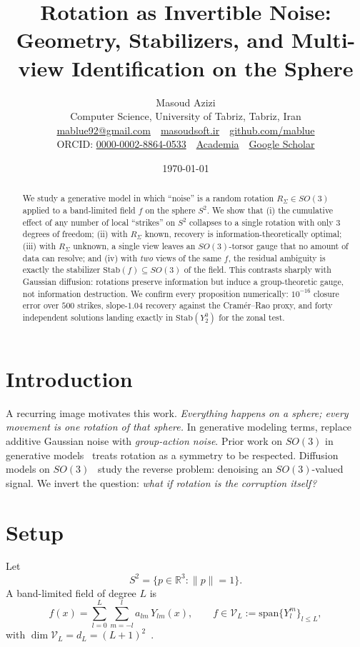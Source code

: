 \documentclass[11pt,a4paper]{article}
\title{\bfseries Rotation as Invertible Noise:\\
Geometry, Stabilizers, and Multi-view Identification on the Sphere}
\author{
  Masoud Azizi\\
  \small Computer Science, University of Tabriz, Tabriz, Iran\\
  \small \href{mailto:mablue92@gmail.com}{mablue92@gmail.com}
  \,\textbar\, \href{https://masoudsoft.ir}{masoudsoft.ir}
  \,\textbar\, \href{https://github.com/mablue}{github.com/mablue}\\
  \small ORCID: \href{https://orcid.org/0000-0002-8864-0533}{0000-0002-8864-0533}
  \,\textbar\, \href{https://independent.academia.edu/azizimasoud}{Academia}
  \,\textbar\, \href{https://scholar.google.com/citations?user=rtZohjUAAAAJ}{Google Scholar}
}
\date{\today}
\theoremstyle{remark}
\begin{document}
\maketitle

\begin{abstract}
We study a generative model in which ``noise'' is a random rotation
$R_\Sigma \in SO(3)$ applied to a band-limited field $f$ on the sphere $S^2$.
We show that (i) the cumulative effect of any number of local ``strikes''
on $S^2$ collapses to a single rotation with only $3$ degrees of freedom;
(ii) with $R_\Sigma$ known, recovery is information-theoretically optimal;
(iii) with $R_\Sigma$ unknown, a single view leaves an $SO(3)$-torsor gauge
that no amount of data can resolve; and (iv) with \emph{two} views of the
same $f$, the residual ambiguity is exactly the stabilizer
$\mathrm{Stab}(f)\subseteq SO(3)$ of the field. This contrasts sharply with
Gaussian diffusion: rotations preserve information but induce a
group-theoretic gauge, not information destruction. We confirm every
proposition numerically: $10^{-16}$ closure error over $500$ strikes,
slope-$1.04$ recovery against the Cramér--Rao proxy, and forty independent
solutions landing exactly in $\mathrm{Stab}(Y_2^0)$ for the zonal test.
\end{abstract}

\section{Introduction}
A recurring image motivates this work. \emph{Everything happens on a
sphere; every movement is one rotation of that sphere.} In generative
modeling terms, replace additive Gaussian noise with \emph{group-action
noise}. Prior work on $SO(3)$ in generative
models~\citep{thomas2018tensor,cohen2018spherical} treats rotation as a
symmetry to be respected. Diffusion models on
$SO(3)$~\citep{leach2022diffusion,yim2023unified} study the reverse
problem: denoising an $SO(3)$-valued signal. We invert the question:
\emph{what if rotation is the corruption itself?}

\section{Setup}
Let
\begin{equation}
S^2 = \{p\in\mathbb{R}^3 : \|p\|=1\}.
\end{equation}
A band-limited field of degree $L$ is
\begin{equation}
f(x) = \sum_{l=0}^{L}\sum_{m=-l}^{l} a_{lm}\, Y_{lm}(x),
\qquad f\in\mathcal{V}_L := \mathrm{span}\{Y_l^m\}_{l\le L},
\end{equation}
with $\dim\mathcal{V}_L = d_L = (L+1)^2$~\citep{driscoll1994computing}.
\end{document}

